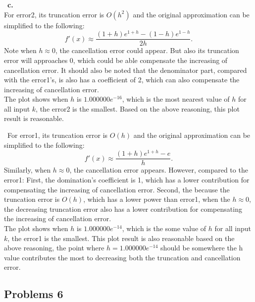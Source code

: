 \documentclass[11pt,fleqn]{exam}
\newcommand{\nn}{~\newline \noindent }
\begin{document}
\nn \textbf{c.}\\
For error2, its truncation error is $O(h^2)$ and the original approximation can be simplified to the following:\\
\begin{equation*}
f'(x) \approx \frac{(1+h)e^{1+h} - (1-h)e^{1-h}}{2h}.
\end{equation*}
Note when $h \approx 0$, the cancellation error could appear. But also its truncation error will approaches 0, which could be able compensate the increasing of cancellation error. It should also be noted that the denominator part, compared with the error1's, is also has a coefficient of 2, which can also compensate the increasing of cancellation error. \\
The plot shows when $h$ is $1.000000e^{-16}$, which is the most nearest value of $h$ for all input $k$, the error2 is the smallest. Based on the above reasoning, this plot result is reasonable.

\nn For error1, its truncation error is $O(h)$ and the original approximation can be simplified to the following:\\
\begin{equation*}
f'(x) \approx \frac{(1+h)e^{1+h} - e}{h}.
\end{equation*}
Similarly, when $h \approx 0$, the cancellation error appears. However, compared to the error1: First, the domination's coefficient is 1, which has a lower contribution for compensating the increasing of cancellation error. Second, the because the truncation error is $O(h)$, which has a lower power than error1, when the $h \approx 0$, the decreasing truncation error also has a lower contribution for compensating the increasing of cancellation error. \\
The plot shows when $h$ is $1.000000e^{-14}$, which is the some value of $h$ for all input $k$, the error1 is the smallest.  This plot result is also reasonable based on the above reasoning, the point where $h = 1.000000e^{-14}$ should be somewhere the h value contributes the most to decreasing both the truncation and cancellation error.

\subsection*{Problems 6}
\end{document}
